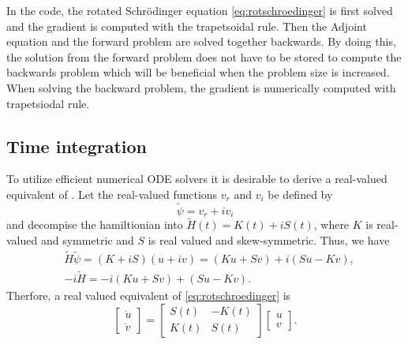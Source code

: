 \documentclass[11pt]{article}
\begin{document}
In the code, the rotated Schr\"odinger equation \eqref{eq:rotschroedinger} is first solved and the gradient is computed with the trapetsoidal rule. Then the Adjoint equation and the forward problem are solved together backwards. By doing this, the solution from the forward problem does not have to be stored to compute the backwards problem which will be beneficial when the problem size is increased. When solving the backward problem, the gradient is numerically computed with trapetsiodal rule.

\subsection{Time integration}
To utilize efficient numerical ODE solvers it is desirable to derive a real-valued equivalent of \label{eq:rotschroedinger}.
Let the real-valued functions $v_r$ and $v_i$ be defined by
%
\begin{equation}
\tilde{\psi} = v_r + i v_i 
\end{equation}
%
and decompise the hamiltionian into $\tilde{H}(t) = K(t) + iS(t)$, where $K$ is real-valued and symmetric and $S$ is real valued and skew-symmetric.
Thus, we have
%
\begin{align}
&\tilde{H}\tilde{\psi} = (K + iS)(u + iv) = (Ku + Sv) + i(Su - Kv), \\
&-i\tilde{H} = -i(Ku + Sv) + (Su -Kv).
\end{align}
%
Therfore, a real valued equivalent of  \eqref{eq:rotschroedinger} is
%
\begin{equation}\label{eq:realshrodinger}
  \begin{bmatrix} \dot{u}\\ \dot{v} \end{bmatrix} =
%
  \begin{bmatrix}
    S(t) & -K(t) \\ K(t) & S(t)
  \end{bmatrix}     
  \begin{bmatrix} u\\ v \end{bmatrix} .
\end{equation}
\end{document}
